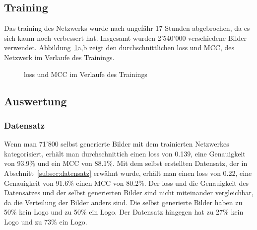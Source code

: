 \documentclass[12pt,a4paper]{report}
\begin{document}
\subsection{Training}
Das training des Netzwerks wurde nach ungefähr 17 Stunden abgebrochen, da es sich kaum noch verbessert hat.
Insgesamt wurden 2'540'000 verschiedene Bilder verwendet.
Abbildung~\ref{fig:loss1}a,b zeigt den durchschnittlichen loss und MCC,
des Netzwerk im Verlaufe des Trainings.
\begin{figure}[h]%
    \centering
    \qquad
    \caption{loss und MCC im Verlaufe des Trainings}%
    \label{fig:loss1}%
\end{figure}
\subsection{Auswertung}
\subsubsection{Datensatz}
Wenn man 71'800 selbst generierte Bilder mit dem trainierten Netzwerkes kategorisiert, erhält man durchschnittich einen loss von 0.139,
eine Genauigkeit von 93.9\% und ein MCC von 88.1\%.
Mit dem selbst erstellten Datensatz, der in Abschnitt~\ref{subsec:datensatz} erwähnt wurde,
erhält man einen loss von 0.22, eine Genauigkeit von 91.6\% einen MCC von 80.2\%.
Der loss und die Genauigkeit des Datensatzes und der selbst generierten Bilder sind nicht miteinander vergleichbar,
da die Verteilung der Bilder anders sind.
Die selbst generierte Bilder haben zu 50\% kein Logo und zu 50\% ein Logo.
Der Datensatz hingegen hat zu 27\% kein Logo und zu 73\% ein Logo.
\end{document}
